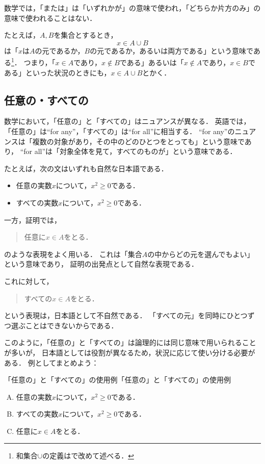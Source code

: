 数学では，「または」は「いずれかが」の意味で使われ，「どちらか片方のみ」の意味で使われることはない．

たとえば，$A,B$を集合とするとき，
\[
  x \in A \cup B
\]
は「$x$は$A$の元であるか，$B$の元であるか，あるいは両方である」という意味である\footnote{和集合$\cup$の定義はで改めて述べる．}．
つまり，「$ x \in A$であり，$x \notin  B$である」あるいは「$ x \notin A$であり，$x \in B$である」といった状況のときにも，$x \in A \cup B$とかく．

\subsection{任意の・すべての}

数学において，「任意の」と「すべての」はニュアンスが異なる．
英語では，「任意の」は``for any''，「すべての」は``for all''に相当する．
``for any''のニュアンスは「複数の対象があり，その中のどのひとつをとっても」という意味であり，
``for all''は「対象全体を見て，すべてのものが」という意味である．

たとえば，次の文はいずれも自然な日本語である．
\begin{itemize}
  \item 任意の実数$x$について，$x^2\ge0$である．
  \item すべての実数$x$について，$x^2\ge0$である．
\end{itemize}

一方，証明では，
\begin{quote}
任意に$x\in A$をとる．
\end{quote}
のような表現をよく用いる．
これは「集合$A$の中からどの元を選んでもよい」という意味であり，
証明の出発点として自然な表現である．

これに対して，
\begin{quote}
すべての$x\in A$をとる．
\end{quote}
という表現は，日本語として不自然である．
「すべての元」を同時にひとつずつ選ぶことはできないからである．

このように，「任意の」と「すべての」は論理的には同じ意味で用いられることが多いが，
日本語としては役割が異なるため，状況に応じて使い分ける必要がある．
例としてまとめよう：

\begin{example}{「任意の」と「すべての」の使用例}{「任意の」と「すべての」の使用例}
  \begin{enumerate}[(A)]
    \item 任意の実数$x$について，$x^2\ge0$である．
    \item すべての実数$x$について，$x^2\ge0$である．
    \item 任意に$x\in A$をとる．
  \end{enumerate}
\end{example}


